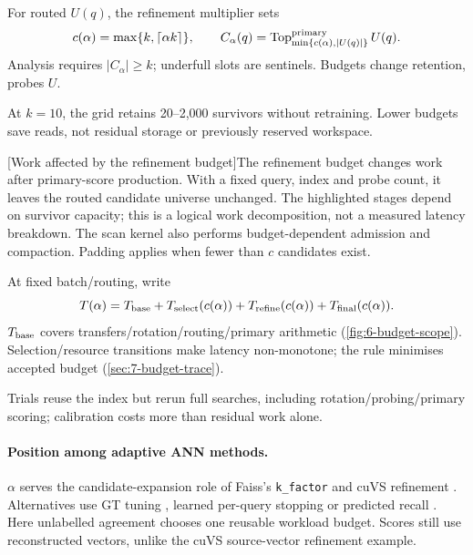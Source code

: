 For routed $U(q)$, the refinement multiplier sets \cite{jhq}
\begin{equation}
 c(\alpha)=\max\{k,\lceil\alpha k\rceil\},\qquad
 C_\alpha(q)=\operatorname{Top}^{\rm primary}_{\min\{c(\alpha),|U(q)|\}}U(q).
 \label{eq:6-budget}
\end{equation}
Analysis requires $|C_\alpha|\geq k$; underfull slots are sentinels. Budgets change retention, probes $U$.

At $k=10$, the grid retains 20--2,000 survivors without retraining. Lower budgets save reads, not residual storage or previously reserved workspace.

\par\medskip\noindent\begin{minipage}{\linewidth}
\captionsetup{hypcap=false}
\centering

[Work affected by the refinement budget]{The refinement budget changes work after primary-score
production. With a fixed query, index and probe count, it leaves the
routed candidate universe unchanged. The highlighted stages depend on
survivor capacity; this is a logical work decomposition, not a measured
latency breakdown. The scan kernel also performs budget-dependent
admission and compaction. Padding applies when fewer than $c$ candidates exist.}
\label{fig:6-budget-scope}
\end{minipage}\par\medskip

At fixed batch/routing, write
\begin{equation}
 T(\alpha)=T_{\rm base}+T_{\rm select}(c(\alpha))+
 T_{\rm refine}(c(\alpha))+T_{\rm final}(c(\alpha)).
 \label{eq:6-cost-model}
\end{equation}
$T_{\rm base}$ covers transfers/rotation/routing/primary arithmetic (\cref{fig:6-budget-scope}). Selection/resource transitions make latency non-monotone; the rule minimises accepted budget (\cref{sec:7-budget-trace}).

Trials reuse the index but rerun full searches, including rotation/probing/primary scoring; calibration costs more than residual work alone.



\paragraph{Position among adaptive ANN methods.}
$\alpha$ serves the candidate-expansion role of Faiss's \texttt{k\_factor} and cuVS refinement \cite{faiss_refine,cuvs_refinement}. Alternatives use GT tuning \cite{faiss_autotune}, learned per-query stopping \cite{li_termination} or predicted recall \cite{darth}. Here unlabelled agreement chooses one reusable workload budget. Scores still use reconstructed vectors, unlike the cuVS source-vector refinement example.